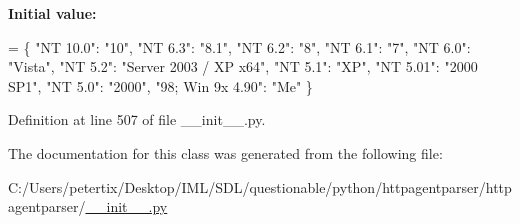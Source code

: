 {\bfseries Initial value\+:}
\begin{DoxyCode}
=  \{
                    \textcolor{stringliteral}{"NT 10.0"}: \textcolor{stringliteral}{"10"},
                    \textcolor{stringliteral}{"NT 6.3"}: \textcolor{stringliteral}{"8.1"},
                    \textcolor{stringliteral}{"NT 6.2"}: \textcolor{stringliteral}{"8"},
                    \textcolor{stringliteral}{"NT 6.1"}: \textcolor{stringliteral}{"7"},
                    \textcolor{stringliteral}{"NT 6.0"}: \textcolor{stringliteral}{"Vista"},
                    \textcolor{stringliteral}{"NT 5.2"}: \textcolor{stringliteral}{"Server 2003 / XP x64"},
                    \textcolor{stringliteral}{"NT 5.1"}: \textcolor{stringliteral}{"XP"},
                    \textcolor{stringliteral}{"NT 5.01"}: \textcolor{stringliteral}{"2000 SP1"},
                    \textcolor{stringliteral}{"NT 5.0"}: \textcolor{stringliteral}{"2000"},
                    \textcolor{stringliteral}{"98; Win 9x 4.90"}: \textcolor{stringliteral}{"Me"}
    \}
\end{DoxyCode}


Definition at line 507 of file \+\_\+\+\_\+init\+\_\+\+\_\+.\+py.



The documentation for this class was generated from the following file\+:\begin{DoxyCompactItemize}
\item 
C\+:/\+Users/petertix/\+Desktop/\+I\+M\+L/\+S\+D\+L/questionable/python/httpagentparser/httpagentparser/\hyperlink{____init_____8py}{\+\_\+\+\_\+init\+\_\+\+\_\+.\+py}\end{DoxyCompactItemize}
